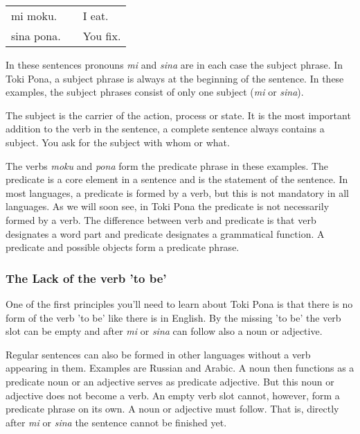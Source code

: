 \begin{supertabular}{p{5,5cm}|ll}
mi moku. && I eat. \\
sina pona. && You fix. \\
\end{supertabular} 

In these sentences pronouns \textit{mi} and \textit{sina} are in each case the subject phrase. 
In Toki Pona, a subject phrase is always at the beginning of the sentence. 
In these examples, the subject phrases consist of only one subject (\textit{mi} or \textit{sina}).

The subject is the carrier of the action, process or state. 
It is the most important addition to the verb in the sentence, a complete sentence always contains a subject. 
You ask for the subject with whom or what.

The verbs \textit{moku} and \textit{pona} form the predicate phrase in these examples.  
The predicate is a core element in a sentence and is the statement of the sentence.
In most languages, a predicate is formed by a verb, but this is not mandatory in all languages. 
As we will soon see, in Toki Pona the predicate is not necessarily formed by a verb. 
The difference between verb and predicate is that verb designates a word part and predicate designates a grammatical function.
A predicate and possible objects form a predicate phrase. 
%
\newpage{}
\subsubsection*{The Lack of the verb 'to be'}
%
One of the first principles you'll need to learn about Toki Pona is that there is no form of the verb 'to be' like there is in English. 
By the missing 'to be' the verb slot can be empty and after \textit{mi} or \textit{sina} can follow also a noun or adjective. 

Regular sentences can also be formed in other languages without a verb appearing in them. 
Examples are Russian and Arabic. 
A noun then functions as a predicate noun or an adjective serves as predicate adjective.
But this noun or adjective does not become a verb. 
An empty verb slot cannot, however, form a predicate phrase on its own. 
A noun or adjective must follow. 
That is, directly after \textit{mi} or \textit{sina} the sentence cannot be finished yet.

